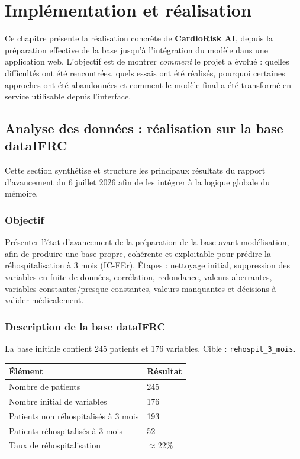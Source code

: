 \documentclass[12pt,a4paper]{report}
\begin{document}
\chapter{Implémentation et réalisation}

Ce chapitre présente la réalisation concrète de \textbf{CardioRisk AI}, depuis la
préparation effective de la base jusqu'à l'intégration du modèle dans une application web.
L'objectif est de montrer \emph{comment} le projet a évolué : quelles difficultés ont été
rencontrées, quels essais ont été réalisés, pourquoi certaines approches ont été abandonnées
et comment le modèle final a été transformé en service utilisable depuis l'interface.

\section{Analyse des données : réalisation sur la base dataIFRC}

Cette section synthétise et structure les principaux résultats du rapport d'avancement
du 6 juillet 2026 afin de les intégrer à la logique globale du mémoire.

\subsection{Objectif}

Présenter l'état d'avancement de la préparation de la base avant modélisation, afin de
produire une base propre, cohérente et exploitable pour prédire la réhospitalisation à
3 mois (IC-FEr). Étapes : nettoyage initial, suppression des variables en fuite de données,
corrélation, redondance, valeurs aberrantes, variables constantes/presque constantes,
valeurs manquantes et décisions à valider médicalement.

\subsection{Description de la base dataIFRC}

La base initiale contient 245 patients et 176 variables. Cible : \texttt{rehospit\_3\_mois}.

\begin{center}
\renewcommand{\arraystretch}{1.2}
\begin{tabular}{@{}l l@{}}
\toprule
\textbf{Élément} & \textbf{Résultat} \\
\midrule
Nombre de patients & 245 \\
Nombre initial de variables & 176 \\
Patients non réhospitalisés à 3 mois & 193 \\
Patients réhospitalisés à 3 mois & 52 \\
Taux de réhospitalisation & $\approx 22\%$ \\
\bottomrule
\end{tabular}
\end{center}
\end{document}
